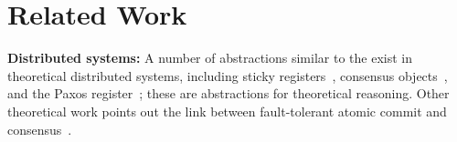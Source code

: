 \section{Related Work}

\textbf{Distributed systems:} A number of abstractions similar to the \WOR{} exist in theoretical distributed systems, including sticky registers~\cite{stickyregister}, consensus objects~\cite{herlihy1991wait}, and the Paxos register~\cite{li2007paxos}; these are abstractions for theoretical reasoning.  Other theoretical work points out the link between fault-tolerant atomic commit and consensus~\cite{frolund2001implementing, hadzilacos1990relationship}. 




